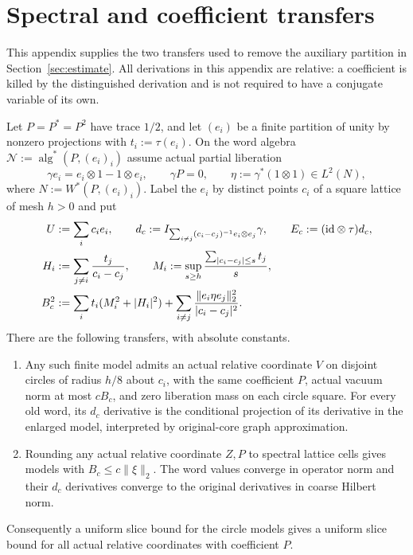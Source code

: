 \section{Spectral and coefficient transfers}\label{sec:reductions}
This appendix supplies the two transfers used to remove the auxiliary partition in Section~\ref{sec:estimate}.
All derivations in this appendix are relative: a coefficient is killed by the distinguished derivation and is not required to have a conjugate variable of its own.

\begin{lemma}\label{lem:lattice-transfer}
Let $P=P^*=P^2$ have trace $1/2$, and let $(e_i)$ be a finite partition of unity by nonzero projections with $t_i:=\tau(e_i)$.
On the word algebra $\mathcal N:=\operatorname{alg}^*(P,(e_i)_i)$ assume actual partial liberation
\[
 \gamma e_i=e_i\otimes1-1\otimes e_i,\qquad \gamma P=0,
 \qquad \eta:=\gamma^*(1\otimes1)\in L^2(N),
\]
where $N:=W^*(P,(e_i)_i)$.
Label the $e_i$ by distinct points $c_i$ of a square lattice of mesh $h>0$ and put
\begin{align*}
 U&:=\sum_ic_ie_i,\qquad
 d_c:=I_{\sum_{i\ne j}(c_i-c_j)^{-1}e_i\otimes e_j}\gamma,
 \qquad E_c:=(\mathrm{id}\otimes\tau)d_c,\\
 H_i&:=\sum_{j\ne i}\frac{t_j}{c_i-c_j},\qquad
 M_i:=\sup_{s\ge h}\frac{\sum_{|c_i-c_j|\le s}t_j}{s},\\
 B_c^2&:=\sum_it_i(M_i^2+|H_i|^2)
 +\sum_{i\ne j}\frac{\|e_i\eta e_j\|_2^2}{|c_i-c_j|^2}.
\end{align*}
There are the following transfers, with absolute constants.
\begin{enumerate}
\item Any such finite model admits an actual relative coordinate $V$ on disjoint circles of radius $h/8$ about $c_i$, with the same coefficient $P$, actual vacuum norm at most $cB_c$, and zero liberation mass on each circle square.
For every old word, its $d_c$ derivative is the conditional projection of its derivative in the enlarged model, interpreted by original-core graph approximation.
\item Rounding any actual relative coordinate $Z,P$ to spectral lattice cells gives models with $B_c\le c\|\xi\|_2$.
The word values converge in operator norm and their $d_c$ derivatives converge to the original derivatives in coarse Hilbert norm.
\end{enumerate}
Consequently a uniform slice bound for the circle models gives a uniform slice bound for all actual relative coordinates with coefficient $P$.
\end{lemma}
